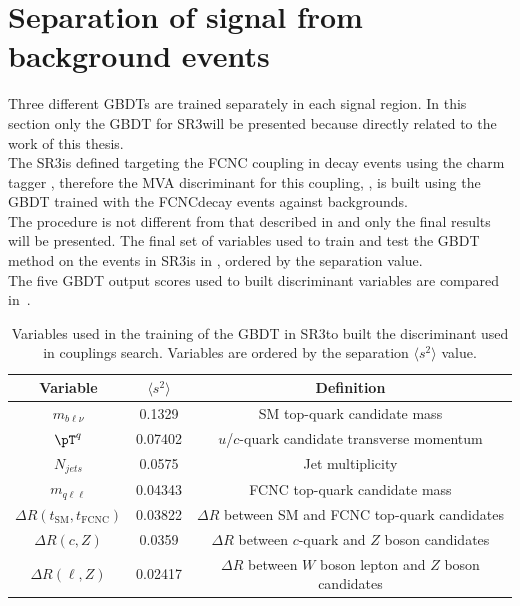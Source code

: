 \section{Separation of signal from background events}
\label{sec:separation_all}
Three different GBDTs are trained separately in each signal region.
In this section only the GBDT for SR3\tZc will be presented because directly related to the work of this thesis.\\
The SR3\tZc is defined targeting the FCNC \tZc coupling in \ttbar decay events using the charm tagger \DLrc, therefore the MVA discriminant for this coupling, \Dthree, is built using the GBDT trained with the FCNC\tZc \ttbar decay events against backgrounds.\\
The procedure is not different from that described in  and only the final results will be presented.
The final set of variables used to train and test the GBDT method on the events in
SR3\tZc is in , ordered by the separation value.\\
The five GBDT output scores used to built discriminant variables are compared in~.\\
\begin{table}[!htbp]
	\small
	\centering
	\begin{tabular}{ccc}
		\toprule
		Variable & $\langle s^{2}\rangle$  & Definition \\
		\midrule
		$m_{b\ell\nu}$  &  0.1329  &  SM top-quark candidate mass  \\
		$\pT^{q}$  &  0.07402  &  $u$/$c$-quark candidate transverse momentum  \\
		$N_{jets}$  &  0.0575  &  Jet multiplicity  \\
		$m_{q\ell\ell}$  &  0.04343  &  FCNC top-quark candidate mass  \\
		$\Delta R(t_{\text{SM}},t_{\text{FCNC}})$  &  0.03822  &  $\Delta R$ between SM and FCNC top-quark candidates  \\
		$\Delta R(c,Z)$  &  0.0359  &  $\Delta R$ between $c$-quark and $Z$ boson candidates  \\
		$\Delta R(\ell,Z)$  &  0.02417  &  $\Delta R$ between $W$ boson lepton and $Z$ boson candidates  \\
		\bottomrule
	\end{tabular}
	\caption{ Variables used in the training of the GBDT in SR3\tZc to built the \Dthree discriminant used in \tZc couplings search. Variables are ordered by the separation 	$\langle s^{2}\rangle$ value. }%
\label{tab:D3input_dl1rc}
\end{table}

